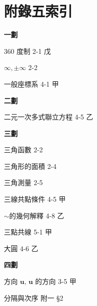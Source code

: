 \section*{附錄五\quad 索\qquad 引}
\label{sec:b3s_a5}

\setlength{\columnsep}{2em}
\begin{multicols}{2}

\begin{center}
\textbf{\large 一\quad 劃}
\end{center}

\noindent $360\text{ 度制}$ \hfill 2-1 戊\par
\noindent $\infty, \pm\infty$ \hfill 2-2\par
\noindent 一般座標系 \hfill 4-1 甲\par

\vspace{0.8em}
\begin{center}
\textbf{\large 二\quad 劃}
\end{center}

\noindent 二元一次多式聯立方程 \hfill 4-5 乙\par

\vspace{0.8em}
\begin{center}
\textbf{\large 三\quad 劃}
\end{center}

\noindent 三角函數 \hfill 2-2\par
\noindent 三角形的面積 \hfill 2-4\par
\noindent 三角測量 \hfill 2-5\par
\noindent 三線共點條件 \hfill 4-5 甲\par
\noindent\hspace*{1.5em} $\sim$的幾何解釋 \hfill 4-8 乙\par
\noindent 三點共線 \hfill 5-1 甲\par
\noindent 大圓 \hfill 4-6 乙\par

\vspace{0.8em}
\begin{center}
\textbf{\large 四\quad 劃}
\end{center}

\noindent 方向 $\boldsymbol{u},\, \boldsymbol{u}\text{ 的方向}$ \hfill 3-5 甲\par
\noindent 分隔與次序 \hfill 附一 \S 2\par


\end{multicols}
